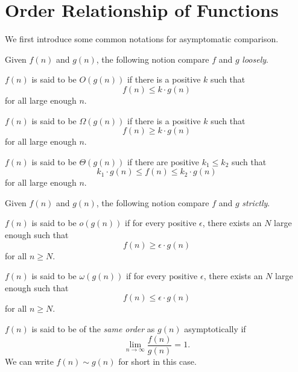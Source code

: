 \section{Order Relationship of Functions}
We first introduce some common notations for asymptomatic comparison.
\begin{definition*}
	Given \(f(n)\) and \(g(n)\), the following notion compare \(f\) and \(g\) \emph{loosely}.
	\begin{definition}[Big-\(O\)]
		\(f(n)\) is said to be \(O(g(n))\) if there is a positive \(k\) such that
		\[
			f(n)\leq k\cdot g(n)
		\]
		for all large enough \(n\).
	\end{definition}

	\begin{definition}
		\(f(n)\) is said to be \(\Omega(g(n))\) if there is a positive \(k\) such that
		\[
			f(n) \geq k\cdot g(n)
		\]
		for all large enough \(n\).
	\end{definition}

	\begin{definition}
		\(f(n)\) is said to be \(\Theta(g(n))\) if there are positive \(k_1\leq k_2\) such that
		\[
			k_1\cdot g(n)\leq f(n) \leq k_2\cdot g(n)
		\]
		for all large enough \(n\).
	\end{definition}
\end{definition*}

\begin{definition*}
	Given \(f(n)\) and \(g(n)\), the following notion compare \(f\) and \(g\) \emph{strictly}.
	\begin{definition}[Small-\(o\)]
		\(f(n)\) is said to be \(o(g(n))\) if for every positive \(\epsilon\), there exists an \(N\) large enough such that
		\[
			f(n) \geq \epsilon\cdot g(n)
		\]
		for all \(n\geq N\).
	\end{definition}

	\begin{definition}
		\(f(n)\) is said to be \(\omega(g(n))\) if for every positive \(\epsilon\), there exists an \(N\) large enough such that
		\[
			f(n) \leq \epsilon\cdot g(n)
		\]
		for all \(n\geq N\).
	\end{definition}

	\begin{definition}\label{def:same-order}
		\(f(n)\) is said to be of the \emph{same order} as \(g(n)\) asymptotically if
		\[
			\lim_{n\to \infty } \frac{f(n)}{g(n)} = 1.
		\]
		We can write \(f(n)\sim g(n)\) for short in this case.
	\end{definition}
\end{definition*}

